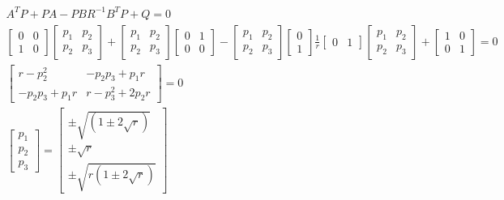 \begin{equation}
\begin{split}
    A^TP+PA-PBR^{-1}B^TP+Q=0\\
    \begin{bmatrix}
        0& 0\\1& 0
    \end{bmatrix}\begin{bmatrix}
        p_1& p_2\\p_2& p_3
    \end{bmatrix}+\begin{bmatrix}
        p_1& p_2\\p_2& p_3
    \end{bmatrix}\begin{bmatrix}
        0& 1\\0& 0
    \end{bmatrix}-\begin{bmatrix}
        p_1& p_2\\p_2& p_3
    \end{bmatrix}\begin{bmatrix}
        0\\1
    \end{bmatrix}\frac{1}{r}\begin{bmatrix}
        0& 1
    \end{bmatrix}\begin{bmatrix}
        p_1& p_2\\p_2& p_3
    \end{bmatrix}+\begin{bmatrix}
        1& 0\\0& 1
    \end{bmatrix}=0\\
    \begin{bmatrix}
        r-p_2^2& -p_2p_3+p_1r\\-p_2p_3+p_1r& r-p_3^2+2p_2r
    \end{bmatrix}=0\\
    \begin{bmatrix}
        p_1\\
        p_2\\
        p_3
    \end{bmatrix}=\begin{bmatrix}
        \pm\sqrt{(1\pm2\sqrt{r})}\\
        \pm\sqrt{r}\\
        \pm\sqrt{r(1\pm2\sqrt{r})}
    \end{bmatrix}
\end{split}
\end{equation}
